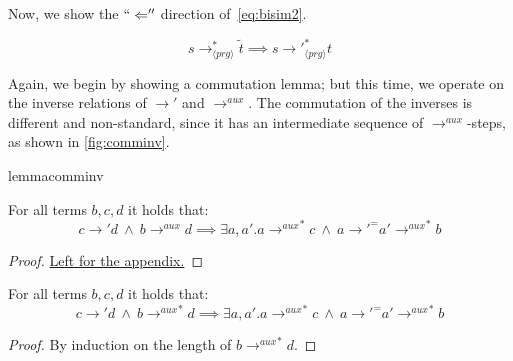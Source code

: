 Now, we show the $`` \Leftarrow ''$ direction of~\ref{eq:bisim2}.

\begin{lemma}
\label{lem:prop2rl}
\[
s \longrightarrow^*_{\langle prg \rangle} \widetilde{t} \implies s {\longrightarrow'}_{\langle prg \rangle}^* t
\]
\end{lemma}

Again, we begin by showing a commutation lemma; but this time, we operate on the inverse relations of $\longrightarrow'$ and $\longrightarrow^{aux}$. The commutation of the inverses is different and non-standard, since it has an intermediate sequence of $\longrightarrow^{aux}$-steps, as shown in \autoref{fig:comminv}.

\begin{restatable}{lemma}{comminv}
\label{lem:comminv}

For all terms $b,c,d$ it holds that:
\[
c {\longrightarrow'} d ~ \land ~ b \longrightarrow^{aux} d \implies \exists a, a' . a {\longrightarrow^{aux}}^* c ~ \land ~ a {\longrightarrow'}^= a' {\longrightarrow^{aux}}^*  b
\]

\end{restatable}
\begin{proof}
\hyperref[prf:comminv]{Left for the appendix.}
\end{proof}

\begin{corollary}
\label{cor:comminvcor}

For all terms $b,c,d$ it holds that:
\[
c \longrightarrow' d ~ \land ~ b {\longrightarrow^{aux}}^* d \implies \exists a, a' . a {\longrightarrow^{aux}}^* c ~ \land ~ a {\longrightarrow'}^= a' {\longrightarrow^{aux}}^* b
\]

\begin{proof}

By induction on the length of $b {\longrightarrow^{aux}}^* d$.

\end{proof}
\end{corollary}

